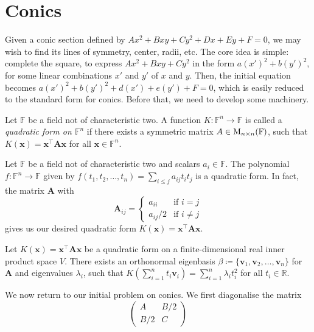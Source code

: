 \documentclass[../Notes.tex]{subfiles}
\begin{document}
\section{Conics}
Given a conic section defined by \(Ax^2+Bxy+Cy^2+Dx+Ey+F=0\), we may wish to find its lines of symmetry, center, radii, etc. The core idea is simple: complete the square, to express \(Ax^2+Bxy+Cy^2\) in the form \(a(x')^2+b(y')^2\), for some linear combinations \(x'\) and \(y'\) of \(x\) and \(y\). Then, the initial equation becomes \(a(x')^2+b(y')^2+d(x')+e(y')+F=0\), which is easily reduced to the standard form for conics. Before that, we need to develop some machinery.
\begin{definition}{}{}
    Let \(\mathbb{F}\) be a field not of characteristic two. A function \(K\colon \mathbb{F}^n\to \mathbb{F}\) is called a \emph{quadratic form on \(\mathbb{F}^n\)} if there exists a symmetric matrix \(A\in\operatorname{M}_{n \times n}(\mathbb{F})\), such that \(K(\mathbf{x})=\mathbf{x}^{\top} \mathbf{A}\mathbf{x}\) for all \(\mathbf{x}\in \mathbb{F}^n\).
\end{definition}
\begin{note}
    Let \(\mathbb{F}\) be a field not of characteristic two and scalars \(a_i\in \mathbb{F}\). The polynomial \(f\colon \mathbb{F}^n\to \mathbb{F}\) given by \(f(t_1,t_2,\dots,t_n)=\sum_{i\leq j}{a_{ij}t_it_j}\) is a quadratic form. In fact, the matrix \(\mathbf{A}\) with 
    \[\mathbf{A}_{ij}=
    \begin{cases}
        a_{ii} &\text{if }i=j\\
        a_{ij}/2 &\text{if }i\neq j
    \end{cases}\]
    gives us our desired quadratic form \(K(\mathbf{x})=\mathbf{x}^{\top}\mathbf{A}\mathbf{x}\).
\end{note}
\begin{theorem}{}{}
    \hypertarget{thm:quadratic-forms-real}{}
    Let \(K(\mathbf{x})=\mathbf{x}^{\top} \mathbf{A}\mathbf{x}\) be a quadratic form on a finite-dimensional real inner product space \(V\). There exists an orthonormal eigenbasis \(\beta\coloneq\{\mathbf{v}_1,\mathbf{v}_2,\dots,\mathbf{v}_n\}\) for \(\mathbf{A}\) and eigenvalues \(\lambda_i\), such that \(K\left( \sum_{i=1}^{n}{t_i \mathbf{v}_i} \right)=\sum_{i=1}^{n}{\lambda_it_i^2}\) for all \(t_i\in \mathbb{R}\).
\end{theorem}
We now return to our initial problem on conics. We first diagonalise the matrix 
\[\begin{pmatrix}
    A & B/2\\
    B/2 & C
\end{pmatrix}\]
\end{document}
